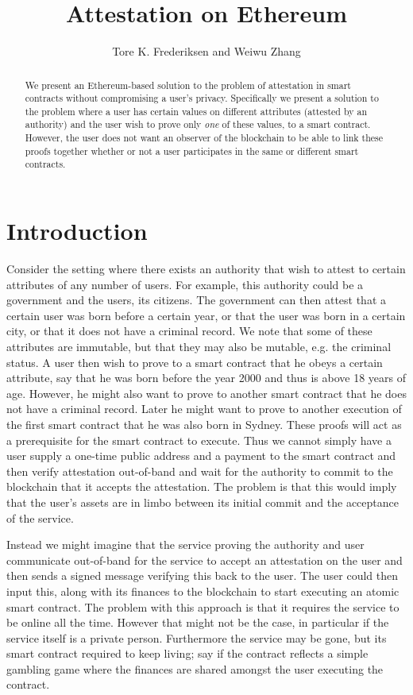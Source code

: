 \documentclass[11pt]{article} %
\author{Tore K. Frederiksen and Weiwu Zhang} \title{Attestation on Ethereum}
\begin{document}
\maketitle
\begin{abstract}
We present an Ethereum-based solution to the problem of attestation in smart contracts without compromising a user's privacy. Specifically we present a solution to the problem where a user has certain values on different attributes (attested by an authority) and the user wish to prove only \emph{one} of these values, to a smart contract. However, the user does not want an observer of the blockchain to be able to link these proofs together whether or not a user participates in the same or different smart contracts.
\end{abstract}


\section{Introduction}
Consider the setting where there exists an authority that wish to attest to certain attributes of any number of users. For example, this authority could be a government and the users, its citizens. The government can then attest that a certain user was born before a certain year, or that the user was born in a certain city, or that it does not have a criminal record. We note that some of these attributes are immutable, but that they may also be mutable, e.g. the criminal status. A user then wish to prove to a smart contract that he obeys a certain attribute, say that he was born before the year 2000 and thus is above 18 years of age. However, he might also want to prove to another smart contract that he does not have a criminal record. Later he might want to prove to another execution of the first smart contract that he was also born in Sydney. These proofs will act as a prerequisite for the smart contract to execute.
Thus we cannot simply have a user supply a one-time public address and a payment to the smart contract and then verify attestation out-of-band and wait for the authority to commit to the blockchain that it accepts the attestation. The problem is that this would imply that the user's assets are in limbo between its initial commit and the acceptance of the service. 

Instead we might imagine that the service proving the authority and user communicate out-of-band for the service to accept an attestation on the user and then sends a signed message verifying this back to the user. The user could then input this, along with its finances to the blockchain to start executing an atomic smart contract. The problem with this approach is that it requires the service to be online all the time. However that might not be the case, in particular if the service itself is a private person. Furthermore the service may be gone, but its smart contract required to keep living; say if the contract reflects a simple gambling game where the finances are shared amongst the user executing the contract.
\end{document}
